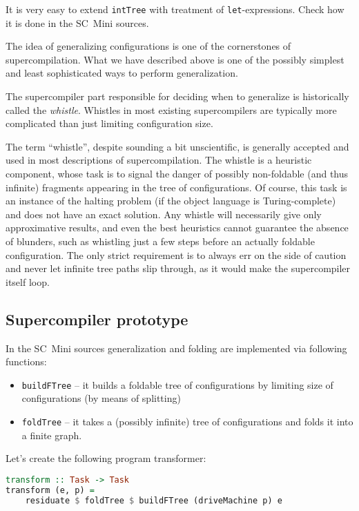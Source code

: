 \begin{exercise}
It is very easy to extend \texttt{intTree} with treatment of \texttt{let}-expressions.
Check how it is done in the SC~Mini sources.
\end{exercise}

The idea of generalizing configurations is one of the cornerstones of supercompilation.
What we have described above is one of the possibly simplest and 
least sophisticated ways to perform generalization.

The supercompiler part responsible for deciding when to generalize is
historically called the \emph{whistle}.
Whistles in most existing supercompilers are typically more complicated
than just limiting configuration size.

The term ``whistle'', despite sounding a bit unscientific, is generally accepted
and used in most descriptions of supercompilation.
The whistle is a heuristic component, whose task is to signal the danger of
possibly non-foldable (and thus infinite) fragments appearing in the tree of configurations.
Of course, this task is an instance of the halting problem
(if the object language is Turing-complete) and does not have an exact solution.
Any whistle will necessarily give only approximative results, and even the
best heuristics cannot guarantee the absence of blunders, such as
whistling just a few steps before an actually foldable configuration.
The only strict requirement is to always err on the side of caution
and never let infinite tree paths slip through, as it would make
the supercompiler itself loop.

\subsection{Supercompiler prototype}

In the SC~Mini sources generalization and folding are implemented via following functions:
\begin{itemize}
\item \texttt{buildFTree} -- it builds a foldable tree of configurations by limiting size of configurations
(by means of splitting)
\item \texttt{foldTree} -- it takes a (possibly infinite) tree of configurations and folds it into a finite graph.
\end{itemize}

Let's create the following program transformer:
\begin{lstlisting}[language=haskell]
transform :: Task -> Task
transform (e, p) =
	residuate $ foldTree $ buildFTree (driveMachine p) e
\end{lstlisting}

